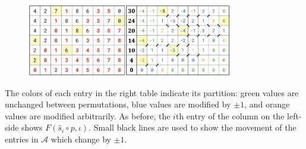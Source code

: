 \documentclass[sn-mathphys]{sn-jnl}
\begin{document}
\begin{figure}[htb!]\label{fig:schedule_construct}
	\center
	\includegraphics[width=0.80\textwidth]{displacement_proof}
\end{figure}
The colors of each entry in the right table indicate its partition: green values are unchanged between permutations, blue values are modified by $\pm 1$, and orange values are modified arbitrarily. As before, the $i$th entry of the column on the left-side shows $F(\hat{s}_i \circ p, \iota)$. Small black lines are used to show the movement of the entries in $\mathcal{A}$ which change by $\pm 1$. 

\end{document}
